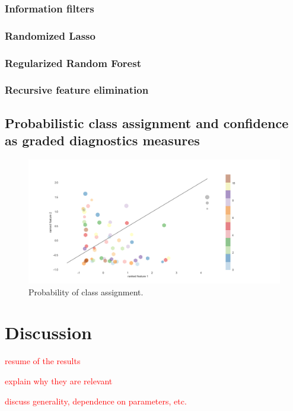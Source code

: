 \documentclass[12pt, a4paper, final, fleqn]{article}
\begin{document}
\subsubsection{Information filters}
\subsubsection{Randomized Lasso}
\subsubsection{Regularized Random Forest}
\subsubsection{Recursive feature elimination}

\subsection{Probabilistic class assignment and confidence as graded diagnostics measures}
\begin{figure}[!htb]
\begin{center}
\includegraphics[width=0.89\columnwidth]{proba_samples_two_features}
  \caption[Probability of class assignment]{Probability of class assignment.
	  \label{fig:probabilistic}}
\end{center}
\end{figure}

\section{Discussion}
\label{discussion}

\textcolor{red}{resume of the results}

\textcolor{red}{explain why they are relevant}

\textcolor{red}{discuss generality, dependence on parameters, etc.}
\end{document}
